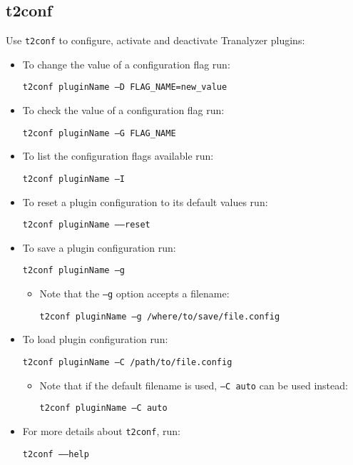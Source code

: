 \documentclass[documentation]{subfiles}
\begin{document}
\subsection{t2conf}\label{t2conf}
Use {\tt t2conf} to configure, activate and deactivate Tranalyzer plugins:
\begin{itemize}
    \item To change the value of a configuration flag run:
          \begin{center}
              {\tt t2conf pluginName --D FLAG\_NAME=new\_value}
          \end{center}
    \item To check the value of a configuration flag run:
          \begin{center}
              {\tt t2conf pluginName --G FLAG\_NAME}
          \end{center}
    \item To list the configuration flags available run:
          \begin{center}
              {\tt t2conf pluginName --I}
          \end{center}
    \item To reset a plugin configuration to its default values run:
          \begin{center}
              {\tt t2conf pluginName --{}--reset}
          \end{center}
    \item To save a plugin configuration run:
          \begin{center}
              {\tt t2conf pluginName --g}
          \end{center}
          \begin{itemize}
              \item Note that the {\tt --g} option accepts a filename:
                    \begin{center}
                        {\tt t2conf pluginName --g /where/to/save/file.config}
                    \end{center}
          \end{itemize}
    \item To load plugin configuration run:
          \begin{center}
              {\tt t2conf pluginName --C /path/to/file.config}
          \end{center}
          \begin{itemize}
              \item Note that if the default filename is used, {\tt --C auto} can be used instead:
                    \begin{center}
                        {\tt t2conf pluginName --C auto}
                    \end{center}
          \end{itemize}
    \item For more details about {\tt t2conf}, run:
          \begin{center}
              {\tt t2conf --{}--help}
          \end{center}
\end{itemize}
\end{document}
